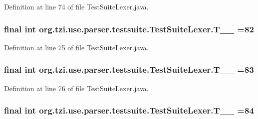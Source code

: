 Definition at line 74 of file Test\-Suite\-Lexer.\-java.

\hypertarget{classorg_1_1tzi_1_1use_1_1parser_1_1testsuite_1_1_test_suite_lexer_a7bc7616f0c1ef5a5d9d0fb3e10b010c3}{
\subsubsection[{T\-\_\-\-\_\-82}]{\setlength{\rightskip}{0pt plus 5cm}final int org.\-tzi.\-use.\-parser.\-testsuite.\-Test\-Suite\-Lexer.\-T\-\_\-\-\_ =82\hspace{0.3cm}{\ttfamily [static]}}}\label{classorg_1_1tzi_1_1use_1_1parser_1_1testsuite_1_1_test_suite_lexer_a7bc7616f0c1ef5a5d9d0fb3e10b010c3}


Definition at line 75 of file Test\-Suite\-Lexer.\-java.

\hypertarget{classorg_1_1tzi_1_1use_1_1parser_1_1testsuite_1_1_test_suite_lexer_a40d5ee6c80101aa0af63df5dd0ce68ca}{
\subsubsection[{T\-\_\-\-\_\-83}]{\setlength{\rightskip}{0pt plus 5cm}final int org.\-tzi.\-use.\-parser.\-testsuite.\-Test\-Suite\-Lexer.\-T\-\_\-\-\_ =83\hspace{0.3cm}{\ttfamily [static]}}}\label{classorg_1_1tzi_1_1use_1_1parser_1_1testsuite_1_1_test_suite_lexer_a40d5ee6c80101aa0af63df5dd0ce68ca}


Definition at line 76 of file Test\-Suite\-Lexer.\-java.

\hypertarget{classorg_1_1tzi_1_1use_1_1parser_1_1testsuite_1_1_test_suite_lexer_aacfd7cb71b958abb233691ded71abb05}{
\subsubsection[{T\-\_\-\-\_\-84}]{\setlength{\rightskip}{0pt plus 5cm}final int org.\-tzi.\-use.\-parser.\-testsuite.\-Test\-Suite\-Lexer.\-T\-\_\-\-\_ =84\hspace{0.3cm}{\ttfamily [static]}}}\label{classorg_1_1tzi_1_1use_1_1parser_1_1testsuite_1_1_test_suite_lexer_aacfd7cb71b958abb233691ded71abb05}


